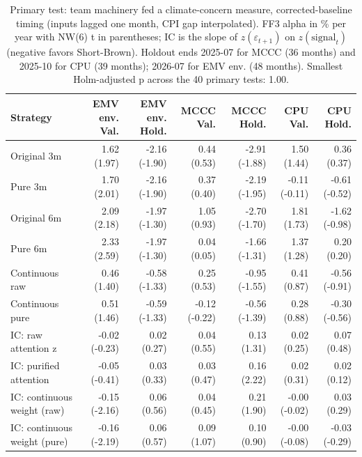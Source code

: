 \begin{table}[htbp]
\centering
\footnotesize
\caption{Primary test: team machinery fed a climate-concern measure, corrected-baseline timing (inputs lagged one month, CPI gap interpolated). FF3 alpha in \% per year with NW(6) t in parentheses; IC is the slope of $z(\varepsilon_{t+1})$ on $z(\text{signal}_t)$ (negative favors Short-Brown). Holdout ends 2025-07 for MCCC (36 months) and 2025-10 for CPU (39 months); 2026-07 for EMV env. (48 months). Smallest Holm-adjusted p across the 40 primary tests: 1.00.}
\label{tab:m1b_primary}
\begin{tabular}{lrrrrrr}
\toprule
Strategy & EMV env. Val. & EMV env. Hold. & MCCC Val. & MCCC Hold. & CPU Val. & CPU Hold. \\
\midrule
Original 3m & 1.62 (1.97) & -2.16 (-1.90) & 0.44 (0.53) & -2.91 (-1.88) & 1.50 (1.44) & 0.36 (0.37) \\
Pure 3m & 1.70 (2.01) & -2.16 (-1.90) & 0.37 (0.40) & -2.19 (-1.95) & -0.11 (-0.11) & -0.61 (-0.52) \\
Original 6m & 2.09 (2.18) & -1.97 (-1.30) & 1.05 (0.93) & -2.70 (-1.70) & 1.81 (1.73) & -1.62 (-0.98) \\
Pure 6m & 2.33 (2.59) & -1.97 (-1.30) & 0.04 (0.05) & -1.66 (-1.31) & 1.37 (1.28) & 0.20 (0.20) \\
Continuous raw & 0.46 (1.40) & -0.58 (-1.33) & 0.25 (0.53) & -0.95 (-1.55) & 0.41 (0.87) & -0.56 (-0.91) \\
Continuous pure & 0.51 (1.46) & -0.59 (-1.33) & -0.12 (-0.22) & -0.56 (-1.39) & 0.28 (0.88) & -0.30 (-0.56) \\
IC: raw attention z & -0.02 (-0.23) & 0.02 (0.27) & 0.04 (0.55) & 0.13 (1.31) & 0.02 (0.25) & 0.07 (0.48) \\
IC: purified attention & -0.05 (-0.41) & 0.03 (0.33) & 0.03 (0.47) & 0.16 (2.22) & 0.02 (0.31) & 0.02 (0.12) \\
IC: continuous weight (raw) & -0.15 (-2.16) & 0.06 (0.56) & 0.04 (0.45) & 0.21 (1.90) & -0.00 (-0.02) & 0.03 (0.29) \\
IC: continuous weight (pure) & -0.16 (-2.19) & 0.06 (0.57) & 0.09 (1.07) & 0.10 (0.90) & -0.00 (-0.08) & -0.03 (-0.29) \\
\bottomrule
\end{tabular}
\end{table}
